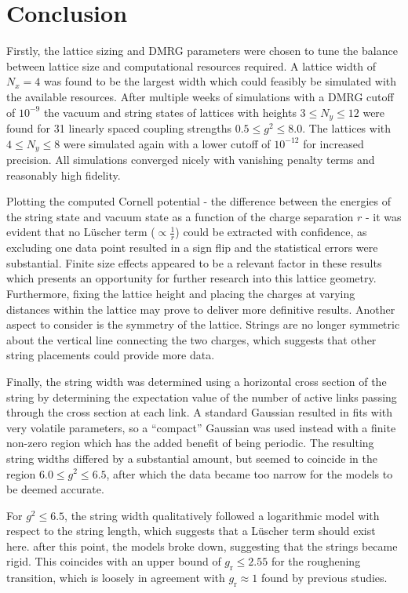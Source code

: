 \documentclass[a4paper,oneside, 11pt,english,listof=totoc,bibliography=totoc]{scrbook}
\begin{document}
\chapter{Conclusion}
Firstly, the lattice sizing and DMRG parameters were chosen to tune the balance between lattice size and computational resources required. A lattice width of $N_x=4$ was found to be the largest width which could feasibly be simulated with the available resources. After multiple weeks of simulations with a DMRG cutoff of $10^{-9}$ the vacuum and string states of lattices with heights $3\leq N_y\leq 12$ were found for 31 linearly spaced coupling strengths $0.5\leq g^2\leq 8.0$. The lattices with $4\leq N_y\leq 8$ were simulated again with a lower cutoff of $10^{-12}$ for increased precision. All simulations converged nicely with vanishing penalty terms and reasonably high fidelity.

Plotting the computed Cornell potential - the difference between the energies of the string state and vacuum state as a function of the charge separation $r$ - it was evident that no L\"uscher term ($\propto \frac{1}{r}$) could be extracted with confidence, as excluding one data point resulted in a sign flip and the statistical errors were substantial. Finite size effects appeared to be a relevant factor in these results which presents an opportunity for further research into this lattice geometry. Furthermore, fixing the lattice height and placing the charges at varying distances within the lattice may prove to deliver more definitive results. Another aspect to consider is the symmetry of the lattice. Strings are no longer symmetric about the vertical line connecting the two charges, which suggests that other string placements could provide more data.

Finally, the string width was determined using a horizontal cross section of the string by determining the expectation value of the number of active links passing through the cross section at each link. A standard Gaussian resulted in fits with very volatile parameters, so a ``compact'' Gaussian was used instead with a finite non-zero region which has the added benefit of being periodic. The resulting string widths differed by a substantial amount, but seemed to coincide in the region $6.0\leq g^2\leq 6.5$, after which the data became too narrow for the models to be deemed accurate.

For $g^2\leq 6.5$, the string width qualitatively followed a logarithmic model with respect to the string length, which suggests that a L\"uscher term should exist here. after this point, the models broke down, suggesting that the strings became rigid. This coincides with an upper bound of $g_\mathrm{r}\leq 2.55$ for the roughening transition, which is loosely in agreement with $g_\mathrm{r}\approx 1$ found by previous studies\cite{DiMarcantonio}.
\end{document}
